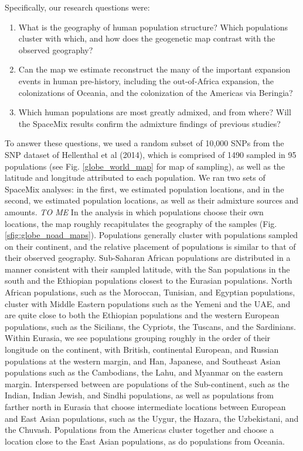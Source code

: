 \documentclass[12pt]{article}
\newcommand{\gb}[1]{{\em \color{magenta} #1}}
\begin{document}
Specifically, our research questions were: 
\begin{enumerate}
\item What is the geography of human population structure?  Which populations cluster with which, and how does the geogenetic map contrast with the observed geography?
\item Can the map we estimate reconstruct the many of the important expansion events in human pre-history, including the out-of-Africa expansion, the colonizations of Oceania, and the colonization of the Americas via Beringia?
\item Which human populations are most greatly admixed, and from where?  Will the SpaceMix results confirm the admixture findings of previous studies?
\end{enumerate}

To answer these questions, we used a random subset of 10,000 SNPs from the SNP dataset of Hellenthal et al (2014), which is comprised of 1490 sampled in 95 populations (see Fig. \ref{globe_world_map} for map of sampling), as well as the latitude and longitude attributed to each population.  We ran two sets of SpaceMix analyses: in the first, we estimated population locations, and in the second, we estimated population locations, as well as their admixture sources and amounts.
\gb{TO ME}
In the analysis in which populations choose their own locations, the map roughly recapitulates the geography of the samples (Fig. \ref{sfig:globe_noad_maps}).  Populations generally cluster with populations sampled on their continent, and the relative placement of populations is similar to that of their observed geography.  Sub-Saharan African populations are distributed in a manner consistent with their sampled latitude, with the San populations in the south and the Ethiopian populations closest to the Eurasian populations.  North African populations, such as the Moroccan, Tunisian, and Egyptian populations, cluster with Middle Eastern populations such as the Yemeni and the UAE, and are quite close to both the Ethiopian populations and the western European populations, such as the Sicilians, the Cypriots, the Tuscans, and the Sardinians.  Within Eurasia, we see populations grouping roughly in the order of their longitude on the continent, with British, continental European, and Russian populations at the western margin, and Han, Japanese, and Southeast Asian populations such as the Cambodians, the Lahu, and Myanmar on the eastern margin.  Interspersed between are populations of the Sub-continent, such as the Indian, Indian Jewish, and Sindhi populations, as well as populations from farther north in Eurasia that choose intermediate locations between European and East Asian populations, such as the Uygur, the Hazara, the Uzbekistani, and the Chuvash.  Populations from the Americas cluster together and choose a location close to the East Asian populations, as do populations from Oceania.
\end{document}
